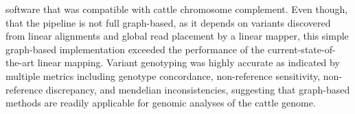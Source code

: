 \documentclass[../main.tex]{subfiles}
\begin{document}


software that was compatible with cattle chromosome complement. Even though, that the pipeline is not full graph-based, as it depends on variants discovered from linear alignments and global read placement by a linear mapper, this simple graph-based implementation exceeded the performance of the current-state-of-the-art linear mapping. Variant genotyping was highly accurate as indicated by multiple metrics including genotype concordance, non-reference sensitivity, non-reference discrepancy, and mendelian inconsistencies, suggesting that graph-based methods are readily applicable for genomic analyses of the cattle genome. 
\end{document}
